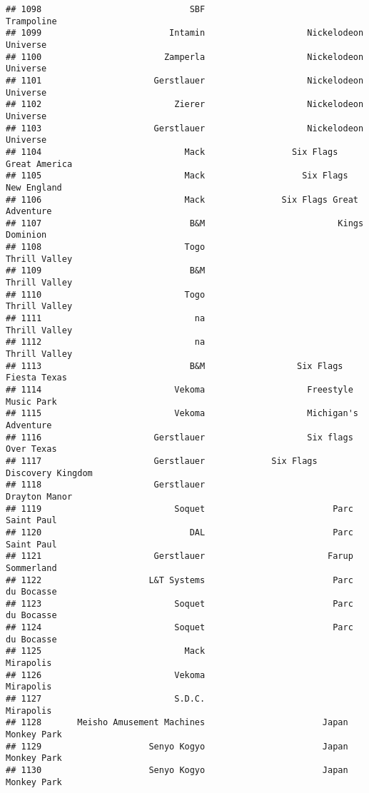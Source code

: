 \documentclass[
]{article}
\begin{document}
\begin{verbatim}
## 1098                             SBF                              Trampoline
## 1099                         Intamin                    Nickelodeon Universe
## 1100                        Zamperla                    Nickelodeon Universe
## 1101                      Gerstlauer                    Nickelodeon Universe
## 1102                          Zierer                    Nickelodeon Universe
## 1103                      Gerstlauer                    Nickelodeon Universe
## 1104                            Mack                 Six Flags Great America
## 1105                            Mack                   Six Flags New England
## 1106                            Mack               Six Flags Great Adventure
## 1107                             B&M                          Kings Dominion
## 1108                            Togo                           Thrill Valley
## 1109                             B&M                           Thrill Valley
## 1110                            Togo                           Thrill Valley
## 1111                              na                           Thrill Valley
## 1112                              na                           Thrill Valley
## 1113                             B&M                  Six Flags Fiesta Texas
## 1114                          Vekoma                    Freestyle Music Park
## 1115                          Vekoma                    Michigan's Adventure
## 1116                      Gerstlauer                    Six flags Over Texas
## 1117                      Gerstlauer             Six Flags Discovery Kingdom
## 1118                      Gerstlauer                           Drayton Manor
## 1119                          Soquet                         Parc Saint Paul
## 1120                             DAL                         Parc Saint Paul
## 1121                      Gerstlauer                        Farup Sommerland
## 1122                     L&T Systems                         Parc du Bocasse
## 1123                          Soquet                         Parc du Bocasse
## 1124                          Soquet                         Parc du Bocasse
## 1125                            Mack                               Mirapolis
## 1126                          Vekoma                               Mirapolis
## 1127                          S.D.C.                               Mirapolis
## 1128       Meisho Amusement Machines                       Japan Monkey Park
## 1129                     Senyo Kogyo                       Japan Monkey Park
## 1130                     Senyo Kogyo                       Japan Monkey Park

\end{verbatim}
\end{document}
